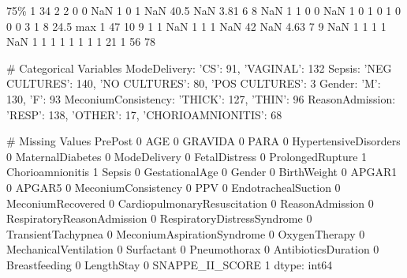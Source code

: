 \documentclass[11pt]{article}
\begin{document}
\begin{codeoutput}
75\%           1    34        2      2                      0                 0          NaN              1                 0                 1           NaN            40.5    NaN         3.81       6       8                 NaN     1                    1                  0                             0             NaN                           1                            0                   1                           0              1                      0           0             0                    3              1           8             24.5
max           1    47       10      9                      1                 1          NaN              1                 1                 1           NaN              42    NaN         4.63       7       9                 NaN     1                    1                  1                             1             NaN                           1                            1                   1                           1              1                      1           1             1                   21              1          56               78

\# Categorical Variables
ModeDelivery: {'CS': 91, 'VAGINAL': 132}
Sepsis: {'NEG CULTURES': 140, 'NO CULTURES': 80, 'POS CULTURES': 3}
Gender: {'M': 130, 'F': 93}
MeconiumConsistency: {'THICK': 127, 'THIN': 96}
ReasonAdmission: {'RESP': 138, 'OTHER': 17, 'CHORIOAMNIONITIS': 68}

\# Missing Values
PrePost                         0
AGE                             0
GRAVIDA                         0
PARA                            0
HypertensiveDisorders           0
MaternalDiabetes                0
ModeDelivery                    0
FetalDistress                   0
ProlongedRupture                1
Chorioamnionitis                1
Sepsis                          0
GestationalAge                  0
Gender                          0
BirthWeight                     0
APGAR1                          0
APGAR5                          0
MeconiumConsistency             0
PPV                             0
EndotrachealSuction             0
MeconiumRecovered               0
CardiopulmonaryResuscitation    0
ReasonAdmission                 0
RespiratoryReasonAdmission      0
RespiratoryDistressSyndrome     0
TransientTachypnea              0
MeconiumAspirationSyndrome      0
OxygenTherapy                   0
MechanicalVentilation           0
Surfactant                      0
Pneumothorax                    0
AntibioticsDuration             0
Breastfeeding                   0
LengthStay                      0
SNAPPE\_II\_SCORE                 1
dtype: int64
\end{codeoutput}
\end{document}
